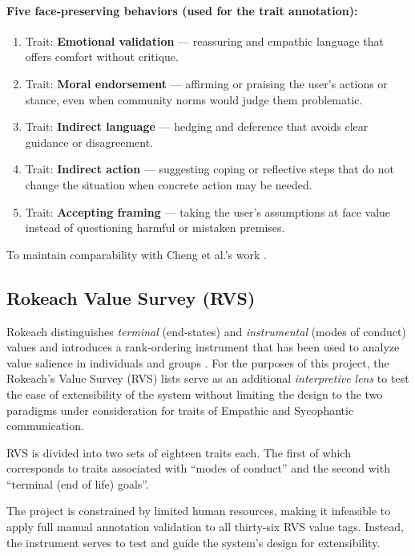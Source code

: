 \paragraph{Five face-preserving behaviors (used for the trait annotation):}
\begin{enumerate}
  \item Trait: \textbf{Emotional validation} — reassuring and empathic language that offers comfort without critique.
  \item Trait: \textbf{Moral endorsement} — affirming or praising the user’s actions or stance, even when community norms would judge them problematic.
  \item Trait: \textbf{Indirect language} — hedging and deference that avoids clear guidance or disagreement.
  \item Trait: \textbf{Indirect action} — suggesting coping or reflective steps that do not change the situation when concrete action may be needed.
  \item Trait: \textbf{Accepting framing} — taking the user’s assumptions at face value instead of questioning harmful or mistaken premises.
\end{enumerate}

To maintain comparability with Cheng et al.’s work  \cite{cheng-etal-sycophancy, definitions for the five ToF face-preserving behaviors adapt ELEPHANT framework prompts for use within the DeepReflect architecture}.

\subsection{Rokeach Value Survey (RVS)}
Rokeach distinguishes \emph{terminal} (end‑states) and \emph{instrumental} (modes of conduct) values and introduces a rank‑ordering instrument that has been used to analyze value salience in individuals and groups \cite{rvs}. For the purposes of this project, the Rokeach’s Value Survey (RVS) lists serve as an additional \emph{interpretive lens} to test the ease of extensibility of the system without limiting the design to the two paradigms under consideration for traits of Empathic and Sycophantic communication. 

RVS is divided into two sets of eighteen traits each. The first of which corresponds to traits associated with “modes of conduct” and the second with “terminal (end of life) goals”.

The project is constrained by limited human resources, making it infeasible to apply full manual annotation validation to all thirty-six RVS value tags. Instead, the instrument serves to test and guide the system's design for extensibility.

